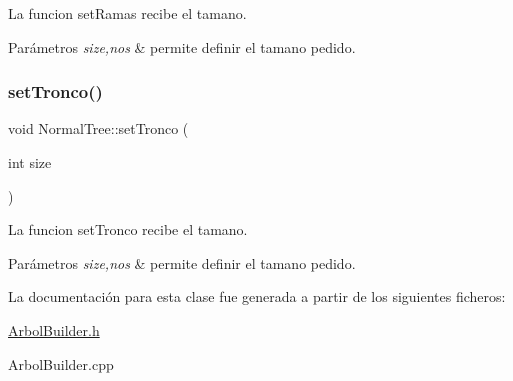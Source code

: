 La funcion set\+Ramas recibe el tamano. 
\begin{DoxyParams}{Parámetros}
{\em size,nos} & permite definir el tamano pedido. \\
\hline
\end{DoxyParams}
\mbox{\label{classNormalTree_a5b04a8afd8b44a3e2f82479da865f380}} 
\subsubsection{\texorpdfstring{set\+Tronco()}{setTronco()}}
{\footnotesize\ttfamily void Normal\+Tree\+::set\+Tronco (\begin{DoxyParamCaption}\item[{int}]{size }\end{DoxyParamCaption})}

La funcion set\+Tronco recibe el tamano. 
\begin{DoxyParams}{Parámetros}
{\em size,nos} & permite definir el tamano pedido. \\
\hline
\end{DoxyParams}


La documentación para esta clase fue generada a partir de los siguientes ficheros\+:\begin{DoxyCompactItemize}
\item 
\hyperlink{ArbolBuilder_8h}{Arbol\+Builder.\+h}\item 
Arbol\+Builder.\+cpp\end{DoxyCompactItemize}
